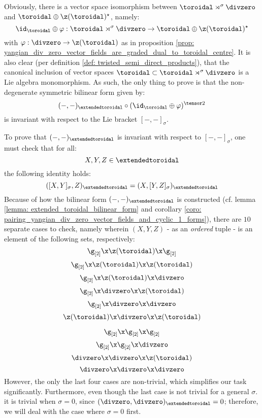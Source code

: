         \begin{remark} \label{remark: yangian_extended_toroidal_lie_algebras_main_theorem_if_direction_proof_outline}
            Obviously, there is a vector space isomorphism between $\toroidal \rtimes^{\sigma} \divzero$ and $\toroidal \oplus \z(\toroidal)^{\star}$, namely:
                $$\id_{\toroidal} \oplus \varphi: \toroidal \rtimes^{\sigma} \divzero \to \toroidal \oplus \z(\toroidal)^{\star}$$
            with $\varphi: \divzero \to \z(\toroidal)$ as in proposition \ref{prop: yangian_div_zero_vector_fields_are_graded_dual_to_toroidal_centre}. It is also clear (per definition \ref{def: twisted_semi_direct_products}), that the canonical inclusion of vector spaces $\toroidal \subset \toroidal \rtimes^{\sigma} \divzero$ is a Lie algebra monomorphism. As such, the only thing to prove is that the non-degenerate symmetric bilinear form given by:
                $$(-, -)_{\extendedtoroidal} \circ (\id_{\toroidal} \oplus \varphi)^{\tensor 2}$$
            is invariant with respect to the Lie bracket $[-, -]_{\sigma}$.

            To prove that $(-, -)_{\extendedtoroidal}$ is invariant with respect to $[-, -]_{\sigma}$, one must check that for all:
                $$X, Y, Z \in \extendedtoroidal$$
            the following identity holds:
                $$( [X, Y]_{\sigma}, Z )_{\extendedtoroidal} = ( X, [Y, Z]_{\sigma} )_{\extendedtoroidal}$$
            Because of how the bilinear form $(-, -)_{\extendedtoroidal}$ is constructed (cf. lemma \ref{lemma: extended_toroidal_bilinear_form} and corollary \ref{coro: pairing_yangian_div_zero_vector_fields_and_cyclic_1_forms}), there are $10$ separate cases to check, namely wherein $(X, Y, Z)$ - as an \textit{ordered} tuple - is an element of the following sets, respectively:
                $$\g_{[2]} \x \z(\toroidal) \x \g_{[2]}$$
                $$\g_{[2]} \x \z(\toroidal) \x \z(\toroidal)$$
                $$\g_{[2]} \x \z(\toroidal) \x \divzero$$
                $$\g_{[2]} \x \divzero \x \z(\toroidal)$$
                $$\g_{[2]} \x \divzero \x \divzero$$
                $$\z(\toroidal) \x \divzero \x \z(\toroidal)$$
                
                $$\g_{[2]} \x \g_{[2]} \x \g_{[2]}$$
                $$\g_{[2]} \x \g_{[2]} \x \divzero$$
                $$\divzero \x \divzero \x \z(\toroidal)$$
                $$\divzero \x \divzero \x \divzero$$
            However, the only the last four cases are non-trivial, which simplifies our task significantly. Furthermore, even though the last case is not trivial for a general $\sigma$. it is trivial when $\sigma = 0$, since $(\divzero, \divzero)_{\extendedtoroidal} = 0$; therefore, we will deal with the case where $\sigma = 0$ first.
        \end{remark}

